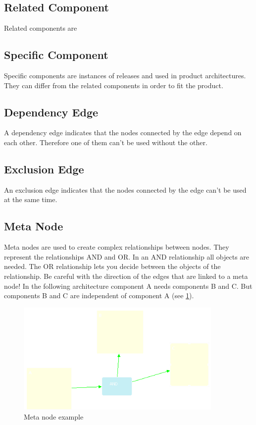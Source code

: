\subsection{Related Component}
Related components are 

\subsection{Specific Component}

Specific components are instances of releases and used in product architectures. They can
differ from the related components in order to fit the product.

\subsection{Dependency Edge}

A dependency edge indicates that the nodes connected by the edge depend on each other.
Therefore one of them can't be used without the other.

\subsection{Exclusion Edge}

An exclusion edge indicates that the nodes connected by the edge can't be used
at the same time.

\subsection{Meta Node}

Meta nodes are used to create complex relationships between nodes. They represent
the relationships AND and OR. In an AND relationship all objects are needed. The OR
relationship lets you decide between the objects of the relationship.
Be careful with
the direction of the edges that are linked to a meta node! In the following architecture component A
needs components B and C. But components B and C are independent of component A (see \ref{example}).

\begin{figure}[h!]
\begin{center}
\includegraphics[width=10cm]{example.png}
   \caption{Meta node example}
\label{example}
\end{center}
\end{figure}\par


